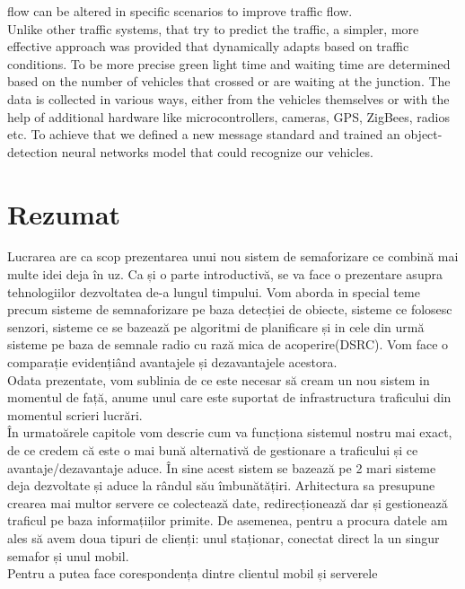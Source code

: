 \documentclass[17pt]{report}
\begin{document}
flow can be altered in specific scenarios to improve traffic flow.\\
\indent
Unlike other traffic systems, that try to predict the traffic, a simpler,
more effective approach was provided that dynamically adapts based on 
traffic conditions. To be more precise green light time and waiting time 
are determined based on the number of vehicles that crossed or are 
waiting at the junction. The data is collected in various ways, either
from the vehicles themselves or with the help of additional hardware
like microcontrollers, cameras, GPS, ZigBees, radios etc. To achieve
that we defined a new message standard and trained an object-detection
neural networks model that could recognize our vehicles.

\pagebreak

\section*{Rezumat}
\indent \indent
Lucrarea are ca scop prezentarea unui nou sistem de semaforizare 
ce combină mai multe idei deja în uz. Ca și o parte introductivă,
se va face o prezentare asupra tehnologiilor dezvoltatea de-a lungul 
timpului. Vom aborda in special teme precum sisteme de semnaforizare 
pe baza detecției de obiecte, sisteme ce folosesc senzori, sisteme ce
se bazează pe algoritmi de planificare și in cele din urmă sisteme
pe baza de semnale radio cu rază mica de acoperire(DSRC).
Vom face o comparație evidențiând avantajele și dezavantajele acestora.\\
\indent \indent
Odata prezentate, vom sublinia de ce este necesar să cream un nou 
sistem in momentul de față, anume unul care este suportat de 
infrastructura traficului din momentul scrieri lucrări. \\
\indent \indent
În urmatoărele capitole vom descrie cum va funcționa sistemul nostru mai
exact, de ce credem că este o mai bună alternativă de gestionare a
traficului și ce avantaje/dezavantaje aduce. În sine 
acest sistem se bazează pe 2 mari sisteme deja dezvoltate și aduce 
la rândul său îmbunătățiri. Arhitectura sa presupune crearea mai multor 
servere ce colectează date, redirecționează dar și gestionează traficul pe 
baza informațiilor primite. De asemenea, pentru a procura datele am 
ales să avem doua tipuri de clienți: unul staționar, conectat direct 
la un singur semafor și unul mobil. \\
\indent \indent
Pentru a putea face corespondența dintre clientul mobil și serverele 
\end{document}
